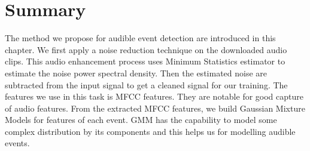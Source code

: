 \section{Summary}
The method we propose for audible event detection are introduced in this chapter. 
We first apply a noise reduction technique on the downloaded audio clips. 
This audio enhancement process uses Minimum Statistics estimator to estimate the noise power spectral density. 
Then the estimated noise are subtracted from the input signal to get a cleaned signal for our training. 
The features we use in this task is MFCC features. 
They are notable for good capture of audio features. 
From the extracted MFCC features, we build Gaussian Mixture Models for features of each event. 
GMM has the capability to model some complex distribution by its components and this helps us for modelling audible events. 
